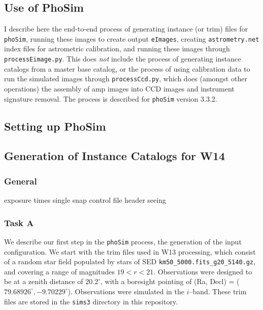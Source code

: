 \documentclass[prd, nofootinbib, floatfix, 11pt, tightenlines, times]{article}
\begin{document}
\clearpage
\begin{appendices}
\section{Use of PhoSim}

I describe here the end-to-end process of generating instance (or
trim) files for {\tt phoSim}, running these images to create output
{\tt eImages}, creating {\tt astrometry.net} index files for
astrometric calibration, and running these images through {\tt
  processEimage.py}.  This does {\it not} include the process of
generating instance catalogs from a master base catalog, or the
process of using calibration data to run the simulated images through
{\tt processCcd.py}, which does (amongst other operations) the
assembly of amp images into CCD images and instrument signature
removal.  The process is described for {\tt phoSim} version 3.3.2.

\subsection{Setting up PhoSim}

\subsection{Generation of Instance Catalogs for W14 \label{appx:tasks}}

\subsubsection{General}
exposure times
single snap
control file
header
seeing

\subsubsection{Task A}

We describe our first step in the {\tt phoSim} process, the generation
of the input configuration.  We start with the trim files used in W13
processing, which consist of a random star field populated by stars of
SED {\tt km50\_5000.fits\_g20\_5140.gz}, and covering a range of
magnitudes $19 < r < 21$.  Observations were designed to be at a
zenith distance of $20.2^{\circ}$, with a boresight pointing of (Ra,
Decl) = ($79.68926^{\circ}, -9.70229^{\circ}$).  Observations were
simulated in the $i$--band.  These trim files are stored in the {\tt sims3}
directory in this repository.


\end{appendices}
\end{document}
